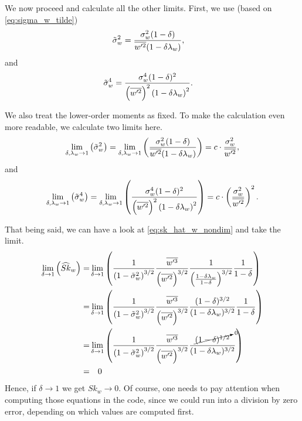 We now proceed and calculate all the other limits.
First, we use (based on \cref{eq:sigma_w_tilde})
\begin{align}
    \label{eq:sigma_w_tilde_2}
    \tilde{\sigma}_w^2
    &= \frac{\sigma_w^2 (1-\delta)}{\overline{w'^2} (1-\delta\lambda_w)},
\end{align}
and
\begin{align}
    \label{eq:sigma_w_tilde_4}
    \tilde{\sigma}_w^4
    &= \frac{\sigma_w^4 (1-\delta)^2}{\left(\overline{w'^2}\right)^2 \left(1-\delta\lambda_w\right)^2}.
\end{align}

We also treat the lower-order moments as fixed.
To make the calculation even more readable,
we calculate two limits here.
\begin{align}
    \label{eq:sigma_w_tilde_2_limit_delta_to_1}
    \lim_{\delta, \lambda_w \to 1}\left(\tilde{\sigma}_w^2\right)
    = \lim_{\delta, \lambda_w \to 1}\left(\frac{\sigma_w^2 (1-\delta)}{\overline{w'^2} (1-\delta\lambda_w)}\right)
    = c \cdot \frac{\sigma_w^2}{\overline{w'^2}},
\end{align}
and
\begin{align}
    \label{eq:sigma_w_tilde_4_limit_delta_to_1}
    \lim_{\delta, \lambda_w \to 1}\left(\tilde{\sigma}_w^4\right)
    = \lim_{\delta, \lambda_w \to 1}\left(\frac{\sigma_w^4 (1-\delta)^2}{\left(\overline{w'^2}\right)^2 \left(1-\delta\lambda_w\right)^2}\right)
    = c \cdot \left(\frac{\sigma_w^2}{\overline{w'^2}}\right)^2.
\end{align}

That being said, we can have a look at \cref{eq:sk_hat_w_nondim} and take the limit.
\begin{align}
    \lim_{\delta \to 1}\left(\widehat{Sk}_w\right)
    =&\lim_{\delta \to 1}
    \left(
    \frac{1}{\left( 1 - \tilde{\sigma}_w^2 \right)^{3/2}}
    \frac{\overline{w'^3}}{\left(\overline{w'^2} \right)^{3/2}}
    \frac{1}{\left(\frac{1-\delta \lambda_w}{1-\delta}\right)^{3/2}}
    \frac{1}{1-\delta}
    \right)
    \nonumber \\
    =&\lim_{\delta \to 1}
    \left(
    \frac{1}{\left( 1 - \tilde{\sigma}_w^2 \right)^{3/2}}
    \frac{\overline{w'^3}}{\left(\overline{w'^2} \right)^{3/2}}
    \frac{(1-\delta)^{3/2}}{(1-\delta \lambda_w)^{3/2}}
    \frac{1}{1-\delta}
    \right)
    \nonumber \\
    =&\lim_{\delta \to 1}
    \left(
    \frac{1}{\left( 1 - \tilde{\sigma}_w^2 \right)^{3/2}}
    \frac{\overline{w'^3}}{\left(\overline{w'^2} \right)^{3/2}}
    \frac{\cancelto{0}{(1-\delta)^{1/2}}}{(1-\delta \lambda_w)^{3/2}}
    \right)
    \nonumber \\
    =& \quad 0
\end{align}
Hence, if $\delta \to 1$ we get $Sk_w \to 0$.
Of course, one needs to pay attention when computing those equations in the code,
since we could run into a division by zero error,
depending on which values are computed first.

